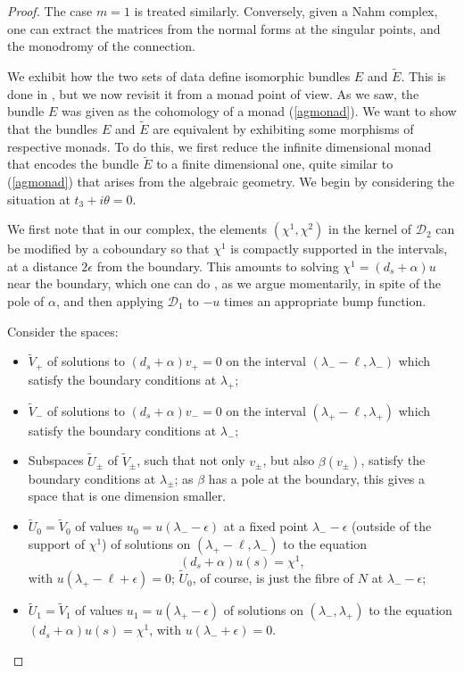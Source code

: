 \documentclass[12pt]{article}
\theoremstyle{definition}
\theoremstyle{remark}
\numberwithin{theorem}{section}
\newcommand{\cD}{\mathcal{D}}
\def\eps{{\epsilon}}
\begin{document}
\begin{proof}
 The case $m= 1$ is treated similarly. Conversely, given a Nahm complex, one can extract the matrices from the normal forms at the singular points, and the monodromy of the connection.
 
 
 
We exhibit  how the two sets of data define isomorphic bundles $E$ and $\widetilde E$. This is done in \cite{Charbonneau:2007zd}, but we now revisit it from a monad point of view. As we saw, the bundle $E$ was given as the cohomology of a monad (\ref{agmonad}). We want to show that the bundles $E$ and $\widetilde E$ are equivalent by exhibiting some morphisms of respective monads.
 To do this, we first reduce the infinite dimensional monad that encodes the  bundle $\widetilde E$   to a finite dimensional one, quite similar to  (\ref{agmonad}) that arises from the algebraic geometry. We begin by considering the situation at $t_3+i\theta = 0$.
 
We first note that in our complex, the elements $(\chi^1, \chi^2)$ in the kernel of $\cD_2$ can be modified by a coboundary so that $\chi^1$ is compactly supported in the intervals, at a distance $2\eps$ from the boundary. This amounts to solving $\chi^1  = (d_s  +  \alpha)u$ near the boundary, which one can do \cite{Donaldson:1985id}, as we argue momentarily, in spite of the pole of $\alpha$,  and then applying $\cD_1$ to $-u$ times an appropriate bump function.
 
Consider the spaces:
\begin{itemize}
\item $\widetilde V_+$ of solutions to $ (d_s  +  \alpha)v_+ = 0$  on the interval $(\lambda_--\ell,\lambda_-)$ which satisfy the boundary conditions at $\lambda_+$;
\item  $\widetilde V_-$  of solutions to $ (d_s  +  \alpha)v_- = 0$  on the interval $(\lambda_+ - \ell,\lambda_+ )$ which satisfy the boundary conditions at $\lambda_-$;
\item Subspaces $\widetilde  U_\pm$ of $\widetilde  V_\pm$, such that not only $v_\pm$, but also $\beta(v_\pm)$, satisfy the boundary conditions at $\lambda_\pm$; as $\beta$ has a pole at the boundary, this gives a space that is one dimension smaller.
\item $\widetilde U_0=\widetilde V_0$ of values $u_0 = u(\lambda_--\epsilon)$  at   a fixed point $\lambda_--\epsilon $  (outside of the support of $\chi^1$) of solutions on $(\lambda_+ -\ell , \lambda_-)$ to the 
equation 
\begin{equation}(d_s  +  \alpha)u (s) = \chi^1,\label{chione}\end{equation}  
with $u(\lambda_+ - \ell  +\epsilon) =0$; $\widetilde U_0$, of course, is just the fibre of $N$ at $\lambda_--\epsilon$;
\item $\widetilde U_1= \widetilde V_1$ of values $u_1 = u (\lambda_+-\epsilon)$ of  solutions  on $(\lambda_-, \lambda_+)$ to the 
equation $(d_s  +  \alpha)u(s) = \chi^1 $, with $u(\lambda_-+\epsilon) =0$. 
 

\end{itemize}
\end{proof}
\end{document}
